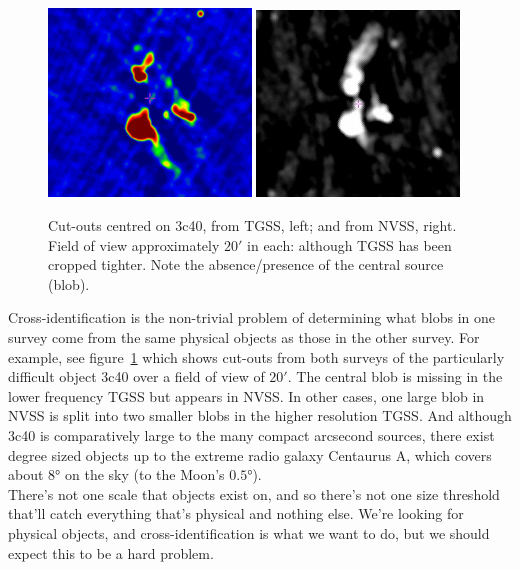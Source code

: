 \documentclass[12pt,a4paper]{article}
\begin{document}
\begin{figure}[H]
    \centering
    \includegraphics[width=0.48\textwidth]{pics/3c40t-cropped.pdf} \;\;
    \includegraphics[width=0.48\textwidth]{pics/3c40n-cropped.pdf}
    \caption{Cut-outs centred on 3c40, from TGSS, left; and from NVSS, right. Field of view approximately $\ang{;20;}$ in each: although TGSS has been cropped tighter. Note the absence/presence of the central source (blob).}
    \label{fig:3c40}
\end{figure}

Cross-identification is the non-trivial problem of determining what blobs in one survey come from the same physical objects as those in the other survey. For example, see figure~\ref{fig:3c40} which shows cut-outs from both surveys of the particularly difficult object 3c40 over a field of view of $\ang{;20;}$. The central blob is missing in the lower frequency TGSS but appears in NVSS. In other cases, one large blob in NVSS is split into two smaller blobs in the higher resolution TGSS.
And although 3c40 is comparatively large to the many compact arcsecond sources, there exist degree sized objects up to the extreme radio galaxy Centaurus A, which covers about $\ang{8}$ on the sky (to the Moon's $\ang{0.5}$).\\

There's not one scale that objects exist on, and so there's not one size threshold that'll catch everything that's physical and nothing else. We're looking for physical objects, and cross-identification is what we want to do, but we should expect this to be a hard problem.
\end{document}
